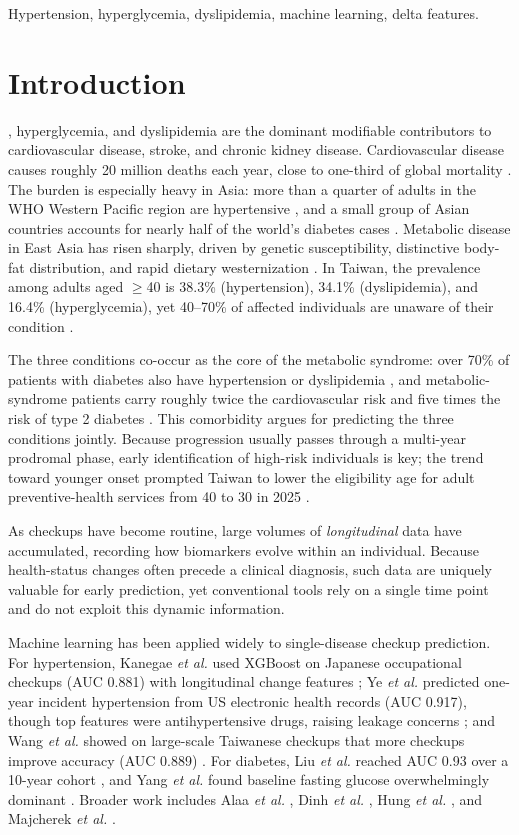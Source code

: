 \documentclass[journal]{IEEEtran}
\begin{document}
\begin{IEEEkeywords}
Hypertension, hyperglycemia, dyslipidemia, machine learning, delta features.
\end{IEEEkeywords}

\section{Introduction}
, hyperglycemia, and dyslipidemia are the dominant modifiable contributors to cardiovascular disease, stroke, and chronic kidney disease. Cardiovascular disease causes roughly 20 million deaths each year, close to one-third of global mortality \cite{ref1}. The burden is especially heavy in Asia: more than a quarter of adults in the WHO Western Pacific region are hypertensive \cite{ref2}, and a small group of Asian countries accounts for nearly half of the world's diabetes cases \cite{ref3}. Metabolic disease in East Asia has risen sharply, driven by genetic susceptibility, distinctive body-fat distribution, and rapid dietary westernization \cite{ref4}. In Taiwan, the prevalence among adults aged $\geq$40 is 38.3\% (hypertension), 34.1\% (dyslipidemia), and 16.4\% (hyperglycemia), yet 40--70\% of affected individuals are unaware of their condition \cite{ref5}.

The three conditions co-occur as the core of the metabolic syndrome: over 70\% of patients with diabetes also have hypertension or dyslipidemia \cite{ref6}, and metabolic-syndrome patients carry roughly twice the cardiovascular risk and five times the risk of type 2 diabetes \cite{ref7}. This comorbidity argues for predicting the three conditions jointly. Because progression usually passes through a multi-year prodromal phase, early identification of high-risk individuals is key; the trend toward younger onset prompted Taiwan to lower the eligibility age for adult preventive-health services from 40 to 30 in 2025 \cite{ref8}.

As checkups have become routine, large volumes of \emph{longitudinal} data have accumulated, recording how biomarkers evolve within an individual. Because health-status changes often precede a clinical diagnosis, such data are uniquely valuable for early prediction, yet conventional tools rely on a single time point and do not exploit this dynamic information.

Machine learning has been applied widely to single-disease checkup prediction. For hypertension, Kanegae \textit{et al.} used XGBoost on Japanese occupational checkups (AUC 0.881) with longitudinal change features \cite{ref9}; Ye \textit{et al.} predicted one-year incident hypertension from US electronic health records (AUC 0.917), though top features were antihypertensive drugs, raising leakage concerns \cite{ref10}; and Wang \textit{et al.} showed on large-scale Taiwanese checkups that more checkups improve accuracy (AUC 0.889) \cite{ref11}. For diabetes, Liu \textit{et al.} reached AUC 0.93 over a 10-year cohort \cite{ref12}, and Yang \textit{et al.} found baseline fasting glucose overwhelmingly dominant \cite{ref13}. Broader work includes Alaa \textit{et al.} \cite{ref14}, Dinh \textit{et al.} \cite{ref15}, Hung \textit{et al.} \cite{ref16}, and Majcherek \textit{et al.} \cite{ref17}.
\end{document}
